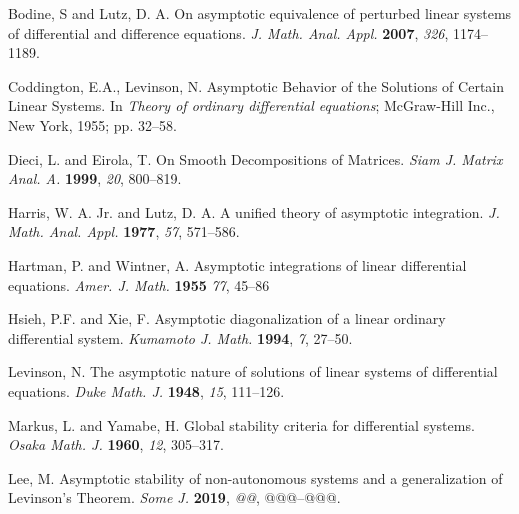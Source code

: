 \documentclass[a4paper,11pt]{article}
\newcounter{Theorem}
\theoremstyle{remark}
\begin{document}
\begin{thebibliography}{999}

Bodine, S and Lutz, D. A. On asymptotic equivalence of perturbed linear systems of differential and difference equations. {\em J. Math. Anal. Appl.} {\bf 2007}, {\em 326}, 1174--1189.


Coddington, E.A., Levinson, N. Asymptotic Behavior of the Solutions of Certain Linear Systems. In {\em Theory of ordinary differential equations}; McGraw-Hill Inc., New York, 1955; pp. 32--58.

Dieci, L. and Eirola, T. On Smooth Decompositions of Matrices. {\em Siam J. Matrix Anal. A.} {\bf 1999}, {\em 20}, 800--819.


Harris, W. A. Jr. and Lutz, D. A. A unified theory of asymptotic integration. {\em J. Math. Anal. Appl.} {\bf 1977}, {\em 57}, 571--586.


Hartman, P. and Wintner, A. Asymptotic integrations of linear differential equations. {\em Amer. J. Math.} {\bf 1955} {\em 77}, 45--86


Hsieh, P.F.  and Xie, F. Asymptotic diagonalization of a linear ordinary differential system. {\em Kumamoto J. Math.} {\bf 1994}, {\em 7}, 27--50.


Levinson, N. The asymptotic nature of solutions of linear systems of differential equations. {\em Duke Math. J.} {\bf 1948}, {\em 15}, 111--126.

Markus, L. and Yamabe, H. Global stability criteria for differential systems. {\em Osaka Math. J.} {\bf 1960}, {\em 12}, 305--317.

Lee, M. Asymptotic stability of non-autonomous systems and a generalization of Levinson's Theorem. {\em Some J.} {\bf 2019}, {\em @@}, @@@--@@@.




\end{thebibliography}
\end{document}
